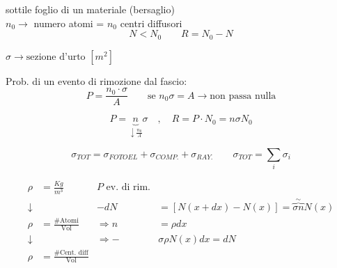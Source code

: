 \documentclass[12pt,a4paper]{article}
\begin{document}

\noindent sottile foglio di un materiale (bersaglio) \\
$n_0 \rightarrow$ numero atomi = $n_0$ centri diffusori
\begin{equation*}
    N < N_0 \qquad R = N_0 - N
\end{equation*}

\vspace{0.5cm}
\noindent $\sigma \rightarrow \text{sezione d'urto } [m^2]$

\vspace{0.3cm}
\noindent Prob. di un evento di rimozione dal fascio:
\begin{equation*}
    P = \frac{n_0 \cdot \sigma}{A} \qquad \text{se } n_0 \sigma = A \rightarrow \text{non passa nulla}
\end{equation*}

\begin{equation*}
    P = \underbrace{n}_{\downarrow \frac{n_0}{A}} \sigma \quad , \quad R = P \cdot N_0 = n \sigma N_0
\end{equation*}

\vspace{0.5cm}
\begin{equation*}
    \sigma_{TOT} = \sigma_{FOTOEL} + \sigma_{COMP.} + \sigma_{RAY.} \qquad \sigma_{TOT} = \sum_i \sigma_i
\end{equation*}

\vspace{0.5cm}

\begin{align*}
    \rho &= \frac{Kg}{m^3} \qquad & P \text{ ev. di rim.} \\
    \downarrow & \text{ } & -dN &= [N(x+dx) - N(x)] = \overbrace{\sigma n}^{\sim} N(x) \\
    \rho &= \frac{\# \text{Atomi}}{\text{Vol}} & \Rightarrow n &= \rho dx \\
    \downarrow & \text{ } & \Rightarrow -&\sigma \rho N(x) dx = dN \\
    \rho &= \frac{\# \text{Cent. diff}}{\text{Vol}} & &
\end{align*}
\end{document}
